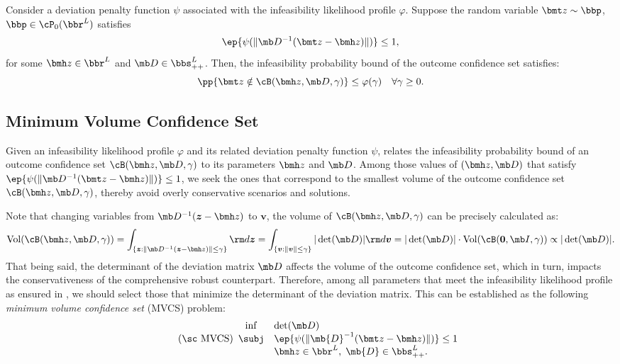\documentclass[opre, blindrev]{informs4}
\newcommand{\1}[1]{\mathds{1}{\left(#1\right)}}
\begin{document}
\begin{theorem}
\label{thm:chap8:ConfidenceRegionBound}
Consider a deviation penalty function $\psi$ associated with the infeasibility likelihood profile $\varphi$. 
Suppose the random variable  $\bmt z \sim \bbp$, $\bbp \in \cP_0(\bbr^L)$ satisfies 
\[  
\ep{\psi(\|\mb D^{-1}(\bmt z - \bmh z)\|)} \leq 1,
\]
for some $\bmh z \in \bbr^L$ and  $\mb D \in \bbs^L_{++}$. Then, the infeasibility probability bound of the outcome confidence set satisfies:
\[
\pp{\bmt z \notin \cB(\bmh z, \mb D, \gamma)} \leq \varphi(\gamma) ~~~\forall \gamma \geq 0.
\]
\end{theorem}

\subsection*{Minimum Volume Confidence Set}

Given an infeasibility likelihood profile $\varphi$ and its related deviation penalty function $\psi$,  relates the infeasibility probability bound of an outcome confidence set $\cB(\bmh z, \mb D, \gamma)$ to its parameters $\bmh z$ and $\mb D$. Among those values of $(\bmh z, \mb D)$ that satisfy $\ep{\psi(\|\mb D^{-1}(\bmt z - \bmh z)\|)} \leq 1$, we seek the ones that correspond to the smallest volume of the outcome confidence set $\cB(\bmh z, \mb D, \gamma)$, thereby avoid overly conservative scenarios and solutions. 

Note that changing variables from $\mb D^{-1} (\bm z - \bmh z)$ to $\bm v$, the volume of $\cB(\bmh z, \mb D, \gamma)$ can be precisely calculated as:
$$
\mathrm{Vol}(\cB(\bmh z, \mb D, \gamma)) =
\int_{ \{\bm z:  \|\mb D^{-1} (\bm z - \bmh z) \| \leq \gamma \} } {\rm d} \bm z
= \int_{ \{ \bm v: \| \bm v \| \leq \gamma \} } |\det(\mb D)| {\rm d} \bm v =  |\det(\mb D)| \cdot \mathrm{Vol}(\cB(\bm 0, \mb I, \gamma)) \propto |\det(\mb D)|. 
$$
That being said, the determinant of the deviation matrix $\mb D$ affects the volume of the outcome confidence set, which in turn, impacts the conservativeness of the comprehensive robust counterpart. Therefore, among all parameters that meet the infeasibility likelihood profile as ensured in , we should select those that minimize the determinant of the deviation matrix. This can be established as the following \textit{minimum volume confidence set} (MVCS) problem:
\begin{equation}
\label{prob:MVCS}
\tag{\sc MVCS}
\begin{array}{cll}
\inf & \displaystyle\det(\mb D) \\
\subj & \displaystyle\ep{\psi(\|\mb{D}^{-1}( \bmt z - \bmh z )\|)} \leq 1 \\
& \bmh z \in \bbr^L, \; \mb{D} \in \bbs^{L}_{++}.  
\end{array} 
\end{equation}
\end{document}
